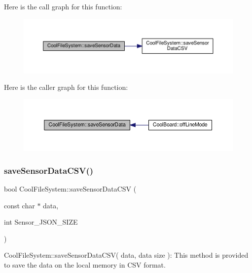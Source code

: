 Here is the call graph for this function\+:\nopagebreak
\begin{figure}[H]
\begin{center}
\leavevmode
\includegraphics[width=350pt]{classCoolFileSystem_a4c560c2ddd40b74b7758e6ceb2c58957_cgraph}
\end{center}
\end{figure}
Here is the caller graph for this function\+:\nopagebreak
\begin{figure}[H]
\begin{center}
\leavevmode
\includegraphics[width=350pt]{classCoolFileSystem_a4c560c2ddd40b74b7758e6ceb2c58957_icgraph}
\end{center}
\end{figure}
\mbox{\label{classCoolFileSystem_af5a51e2b9bb6e7e7edf75a508fe75f82}} 
\subsubsection{\texorpdfstring{save\+Sensor\+Data\+C\+S\+V()}{saveSensorDataCSV()}}
{\footnotesize\ttfamily bool Cool\+File\+System\+::save\+Sensor\+Data\+C\+SV (\begin{DoxyParamCaption}\item[{const char $\ast$}]{data,  }\item[{int}]{Sensor\+\_\+\+J\+S\+O\+N\+\_\+\+S\+I\+ZE }\end{DoxyParamCaption})}

Cool\+File\+System\+::save\+Sensor\+Data\+C\+S\+V( data, data size )\+: This method is provided to save the data on the local memory in C\+SV format.


